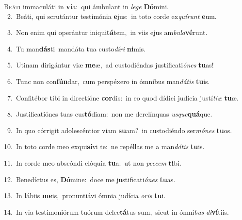 \lettrine{\initial\textcolor{\initialcolor}{B}}{eáti} immaculáti in \textbf{vi}\-a:~\star qui ámbulant in \textit{le}\-\textit{ge} \textbf{Dó}\-mini.\\
{\numbfont\textcolor{\numbcolor}{~2.}}~Beáti, qui scrutántur testimónia \textbf{e}\-jus:~\star in toto corde ex\-\textit{quí}\-\textit{runt} \textbf{e}\-um.\par
{\numbfont\textcolor{\numbcolor}{~3.}}~Non enim qui operántur iniqui\-\textbf{tá}\-tem,~\star in viis ejus am\-\textit{bu}\-\textit{la}\textbf{vé}runt.\par
{\numbfont\textcolor{\numbcolor}{~4.}}~Tu man\-\textbf{dás}\-ti~\star mandáta tua custo\-\textit{dí}\-\textit{ri} \textbf{ni}\-mis.\par
{\numbfont\textcolor{\numbcolor}{~5.}}~Utinam dirigántur viæ \textbf{me}\-æ,~\star ad custodiéndas justificati\-\textit{ó}\-\textit{nes} \textbf{tu}\-as!\par
{\numbfont\textcolor{\numbcolor}{~6.}}~Tunc non con\-\textbf{fún}\-dar,~\star cum perspéxero in ómnibus man\-\textit{dá}\-\textit{tis} \textbf{tu}\-is.\par
{\numbfont\textcolor{\numbcolor}{~7.}}~Confitébor tibi in directióne \textbf{cor}\-dis:~\star in eo quod dídici judícia justí\-\textit{ti}\-\textit{æ} \textbf{tu}\-æ.\par
{\numbfont\textcolor{\numbcolor}{~8.}}~Justificatiónes tuas cus\-\textbf{tó}\-diam:~\star non me derelínquas \textit{us}\-\textit{que}\textbf{quá}que.\par
{\numbfont\textcolor{\numbcolor}{~9.}}~In quo córrigit adolescéntior viam \textbf{su}\-am?~\star in custodiéndo ser\-\textit{mó}\-\textit{nes} \textbf{tu}\-os.\par
{\numbfont\textcolor{\numbcolor}{10.}}~In toto corde meo exqui\-\textbf{sí}\-vi te:~\star ne repéllas me a man\-\textit{dá}\-\textit{tis} \textbf{tu}\-is.\par
{\numbfont\textcolor{\numbcolor}{11.}}~In corde meo abscóndi elóquia \textbf{tu}\-a:~\star ut non \textit{pec}\-\textit{cem} \textbf{ti}\-bi.\par
{\numbfont\textcolor{\numbcolor}{12.}}~Benedíctus es, \textbf{Dó}\-mine:~\star doce me justificati\-\textit{ó}\-\textit{nes} \textbf{tu}\-as.\par
{\numbfont\textcolor{\numbcolor}{13.}}~In lábiis \textbf{me}\-is,~\star pronuntiávi ómnia judícia \textit{o}\-\textit{ris} \textbf{tu}\-i.\par
{\numbfont\textcolor{\numbcolor}{14.}}~In via testimoniórum tuórum delec\-\textbf{tá}\-tus sum,~\star sicut in ómni\textit{bus} \textit{di}\-\textbf{ví}tiis.\par
